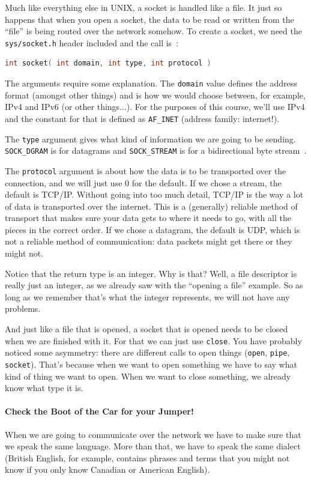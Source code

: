 Much like everything else in UNIX, a socket is handled like a file. It just so happens that when you open a socket, the data to be read or written from the ``file'' is being routed over the network somehow. To create a socket, we need the \texttt{sys/socket.h} header included and the call is~\cite{apunix}:

\begin{lstlisting}[language=C]
int socket( int domain, int type, int protocol )
\end{lstlisting}

The arguments require some explanation. The \texttt{domain} value defines the address format (amongst other things) and is how we would choose between, for example, IPv4 and IPv6 (or other things...). For the purposes of this course, we'll use IPv4 and the constant for that is defined as \texttt{AF\_INET} (address family: internet!).

The \texttt{type} argument gives what kind of information we are going to be sending. \texttt{SOCK\_DGRAM} is for datagrams and \texttt{SOCK\_STREAM} is for a bidirectional byte stream~\cite{apunix}.

The \texttt{protocol} argument is about how the data is to be transported over the connection, and we will just use 0 for the default. If we chose a stream, the default is TCP/IP. Without going into too much detail, TCP/IP is the way a lot of data is transported over the internet. This is a (generally) reliable method of transport that makes sure your data gets to where it needs to go, with all the pieces in the correct order. If we chose a datagram, the default is UDP, which is not a reliable method of communication: data packets might get there or they might not.

Notice that the return type is an integer. Why is that? Well, a file descriptor is really just an integer, as we already saw with the ``opening a file'' example. So as long as we remember that's what the integer represents, we will not have any problems.

And just like a file that is opened, a socket that is opened needs to be closed when we are finished with it. For that we can just use \texttt{close}. You have probably noticed some asymmetry: there are different calls to open things (\texttt{open}, \texttt{pipe}, \texttt{socket}). That's because when we want to open something we have to say what kind of thing we want to open. When we want to close something, we already know what type it is.

\paragraph{Check the Boot of the Car for your Jumper!}
When we are going to communicate over the network we have to make sure that we speak the same language. More than that, we have to speak the same dialect (British English, for example, contains phrases and terms that you might not know if you only know Canadian or American English).

